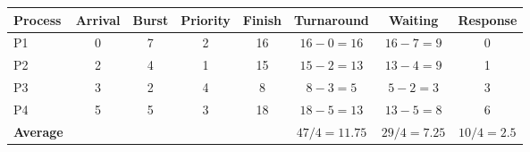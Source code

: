 \begin{tabular}{@{}lccccccc@{}}
\toprule
\textbf{Process} & \textbf{Arrival} & \textbf{Burst} & \textbf{Priority} & \textbf{Finish} & \textbf{Turnaround} & \textbf{Waiting} & \textbf{Response}\\
\midrule
P1 & 0 & 7 & 2 & 16 & $16-0=16$ & $16-7=9$ & 0\\
P2 & 2 & 4 & 1 & 15 & $15-2=13$ & $13-4=9$ & 1\\
P3 & 3 & 2 & 4 & 8 & $8-3=5$ & $5-2=3$ & 3\\
P4 & 5 & 5 & 3 & 18 & $18-5=13$ & $13-5=8$ & 6\\
\midrule
\textbf{Average} &  &  &  &  & $47/4=11.75$ & $29/4=7.25$ & $10/4=2.5$\\
\bottomrule
\end{tabular}
